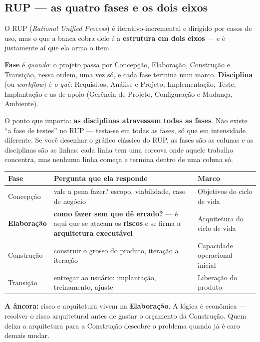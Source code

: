 \subsection{RUP --- as quatro fases e os dois eixos}

O RUP (\emph{Rational Unified Process}) é iterativo-incremental e dirigido por
casos de uso, mas o que a banca cobra dele é a \textbf{estrutura em dois
eixos} --- e é justamente aí que ela arma o item.

\begin{conceito}
\textbf{Fase} é \emph{quando}: o projeto passa por Concepção, Elaboração,
Construção e Transição, nessa ordem, uma vez só, e cada fase termina num
marco. \textbf{Disciplina} (ou \emph{workflow}) é \emph{o quê}: Requisitos,
Análise e Projeto, Implementação, Teste, Implantação e as de apoio (Gerência
de Projeto, Configuração e Mudança, Ambiente).

O ponto que importa: \textbf{as disciplinas atravessam todas as fases}. Não
existe ``a fase de testes'' no RUP --- testa-se em todas as fases, só que em
intensidade diferente. Se você desenhar o gráfico clássico do RUP, as fases
são as colunas e as disciplinas são as linhas: cada linha tem uma corcova onde
aquele trabalho concentra, mas nenhuma linha começa e termina dentro de uma
coluna só.

\begin{center}
\begin{tabular}{@{}p{2.4cm}p{5.2cm}p{4.4cm}@{}}
\toprule
\textbf{Fase} & \textbf{Pergunta que ela responde} & \textbf{Marco} \\
\midrule
Concepção & vale a pena fazer? escopo, viabilidade, caso de negócio & Objetivos do ciclo de vida \\
\textbf{Elaboração} & \textbf{como fazer sem que dê errado?} --- é aqui que se atacam os \textbf{riscos} e se firma a \textbf{arquitetura executável} & Arquitetura do ciclo de vida \\
Construção & construir o grosso do produto, iteração a iteração & Capacidade operacional inicial \\
Transição & entregar ao usuário: implantação, treinamento, ajuste & Liberação do produto \\
\bottomrule
\end{tabular}
\end{center}

\textbf{A âncora:} risco e arquitetura vivem na \textbf{Elaboração}. A lógica
é econômica --- resolver o risco arquitetural antes de gastar o orçamento da
Construção. Quem deixa a arquitetura para a Construção descobre o problema
quando já é caro demais mudar.
\end{conceito}

